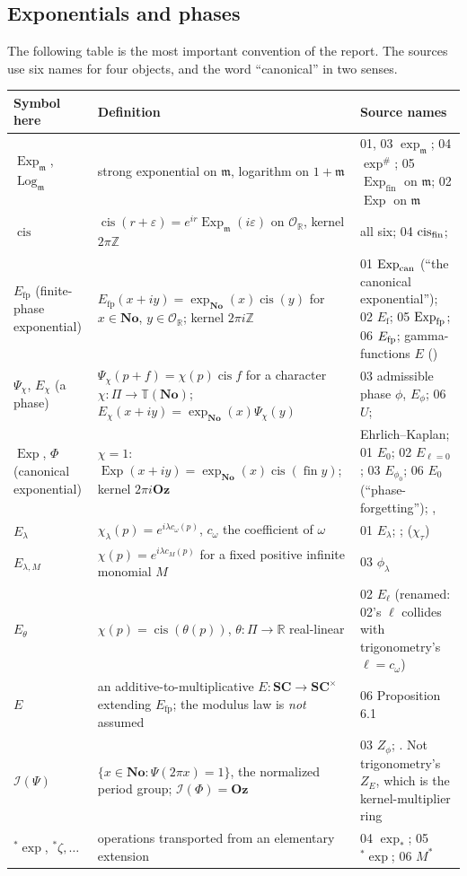 \documentclass[11pt,a4paper]{article}
\numberwithin{equation}{section}
\theoremstyle{definition}
\theoremstyle{remark}
\newcommand{\No}{\mathbf{No}}
\newcommand{\SC}{\mathbf{SC}}
\newcommand{\Oz}{\mathbf{Oz}}
\newcommand{\R}{\mathbb R}
\newcommand{\Z}{\mathbb Z}
\newcommand{\OO}{\mathcal O}
\newcommand{\mm}{\mathfrak m}
\newcommand{\TT}{\mathbb T}
\newcommand{\eps}{\varepsilon}
\newcommand{\fin}{\operatorname{fin}}
\newcommand{\cis}{\operatorname{cis}}
\newcommand{\Exp}{\operatorname{Exp}}
\newcommand{\Ex}{\operatorname{Exp}_{\mm}}
\newcommand{\Lgm}{\operatorname{Log}_{\mm}}
\newcommand{\Efp}{E_{\mathrm{fp}}}
\newcommand{\cI}{\mathcal I}
\begin{document}
\subsection{Exponentials and phases}\label{gz:sec:expconv}
The following table is the most important convention of the report. The
sources use six names for four objects, and the word ``canonical'' in two
senses.
\begin{center}\small
\begin{longtable}{@{}P{0.20\textwidth}P{0.30\textwidth}P{0.42\textwidth}@{}}
\toprule
Symbol here & Definition & Source names\\
\midrule
\endhead
$\Ex$, $\Lgm$ & strong exponential on $\mm$, logarithm on $1+\mm$ & 01, 03 $\exp_\mm$; 04 $\exp^\#$; 05 $\operatorname{Exp}_{\mathrm{fin}}$ on $\mm$; 02 $\operatorname{Exp}$ on $\mm$\\
$\cis$ & $\cis(r+\eps)=e^{ir}\Ex(i\eps)$ on $\OO_\R$, kernel $2\pi\Z$ & all six; 04 $\cis_{\rm fin}$; \\
$\Efp$ (finite-phase exponential) & $\Efp(x+iy)=\exp_{\No}(x)\cis(y)$ for $x\in\No$, $y\in\OO_\R$; kernel $2\pi i\Z$ & 01 $\operatorname{Exp}_{\rm can}$ (``the canonical exponential''); 02 $E_{\mathrm f}$; 05 $\operatorname{Exp}_{\rm fp}$; 06 $E_{\rm fp}$; gamma-functions $E$ ()\\
$\Psi_\chi$, $E_\chi$ (a phase) & $\Psi_\chi(p+f)=\chi(p)\cis f$ for a character $\chi:\Pi\to\TT(\No)$; $E_\chi(x+iy)=\exp_{\No}(x)\Psi_\chi(y)$ & 03 admissible phase $\phi$, $E_\phi$; 06 $U$; \\
$\Exp$, $\Phi$ (canonical exponential) & $\chi=1$: $\Exp(x+iy)=\exp_{\No}(x)\cis(\fin y)$; kernel $2\pi i\Oz$ & Ehrlich--Kaplan; 01 $E_0$; 02 $E_{\ell=0}$; 03 $E_{\phi_0}$; 06 $E_0$ (``phase-forgetting''); , \\
$E_\lambda$ & $\chi_\lambda(p)=e^{i\lambda c_\omega(p)}$, $c_\omega$ the coefficient of $\omega$ & 01 $E_\lambda$; ;  ($\chi_\tau$)\\
$E_{\lambda,M}$ & $\chi(p)=e^{i\lambda c_M(p)}$ for a fixed positive infinite monomial $M$ & 03 $\phi_\lambda$\\
$E_\theta$ & $\chi(p)=\cis(\theta(p))$, $\theta:\Pi\to\R$ real-linear & 02 $E_\ell$ (renamed: 02's $\ell$ collides with trigonometry's $\ell=c_\omega$)\\
$E$ & an additive-to-multiplicative $E:\SC\to\SC^\times$ extending $\Efp$; the modulus law is \emph{not} assumed & 06 Proposition 6.1\\
$\cI(\Psi)$ & $\{x\in\No:\Psi(2\pi x)=1\}$, the normalized period group; $\cI(\Phi)=\Oz$ & 03 $Z_\phi$; . Not trigonometry's $Z_E$, which is the kernel-multiplier ring\\
${}^*\exp$, ${}^*\zeta,\dots$ & operations transported from an elementary extension & 04 $\exp_*$; 05 ${}^*\exp$; 06 $M^*$\\
\bottomrule
\end{longtable}
\addtocounter{table}{-1}
\end{center}
\end{document}
